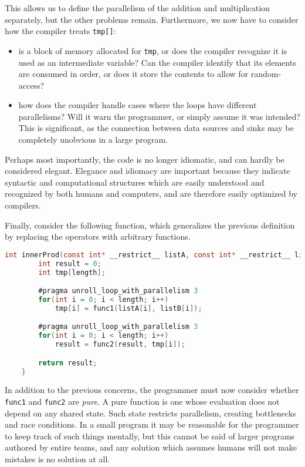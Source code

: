 \documentclass[english,onecolumn]{scrartcl}
\begin{document}
This allows us to define the parallelism of the addition and multiplication separately, but the other problems remain.
Furthermore, we now have to consider how the compiler treats \texttt{tmp[]}:
\begin{itemize}
    \item is a block of memory allocated for \texttt{tmp}, or does the compiler recognize it is used as an intermediate variable?
            Can the compiler identify that its elements are consumed in order, or does it store the contents to allow for
            random-access?
    \item how does the compiler handle cases where the loops have different parallelisms? Will it warn the programmer, or simply
            assume it was intended? This is significant, as the connection between data sources and sinks may be completely
            unobvious in a large program.
\end{itemize}
Perhaps most importantly, the code is no longer idiomatic, and can hardly be considered elegant. Elegance and idiomacy are
important because they indicate syntactic and computational structures which are easily understood and recognized by both humans
and computers, and are therefore easily optimized by compilers.

Finally, consider the following function, which generalizes the previous definition by replacing the operators with arbitrary
functions.

\begin{lstlisting}[language=C]
    int innerProd(const int* __restrict__ listA, const int* __restrict__ listB, int length){
        int result = 0;
        int tmp[length];

        #pragma unroll_loop_with_parallelism 3
        for(int i = 0; i < length; i++)
            tmp[i] = func1(listA[i], listB[i]);

        #pragma unroll_loop_with_parallelism 3
        for(int i = 0; i < length; i++)
            result = func2(result, tmp[i]);

        return result;
    }
\end{lstlisting}

In addition to the previous concerns, the programmer must now consider whether \texttt{func1} and \texttt{func2} are
\textit{pure}. A pure function is one whose evaluation does not depend on any shared state. Such state restricts parallelism,
creating bottlenecks and race conditions. In a small program it may be reasonable for the programmer to keep track of such things
mentally, but this cannot be said of larger programs authored by entire teams, and any solution which assumes humans will not make
mistakes is no solution at all.
\end{document}

